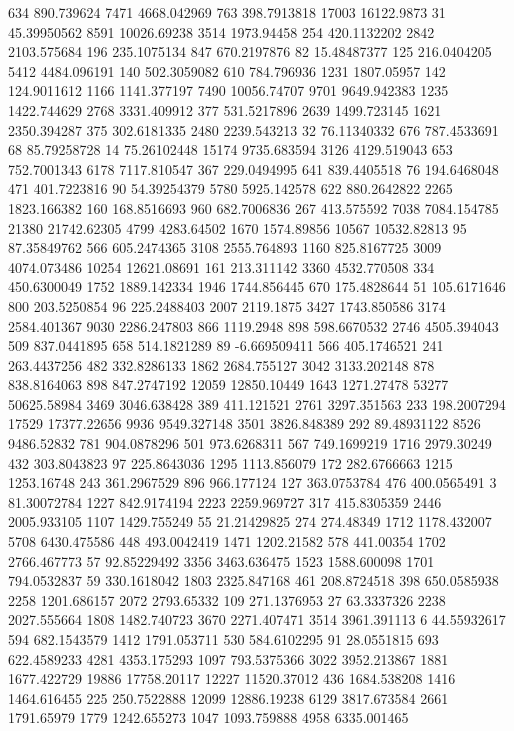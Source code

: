 634	890.739624
7471	4668.042969
763	398.7913818
17003	16122.9873
31	45.39950562
8591	10026.69238
3514	1973.94458
254	420.1132202
2842	2103.575684
196	235.1075134
847	670.2197876
82	15.48487377
125	216.0404205
5412	4484.096191
140	502.3059082
610	784.796936
1231	1807.05957
142	124.9011612
1166	1141.377197
7490	10056.74707
9701	9649.942383
1235	1422.744629
2768	3331.409912
377	531.5217896
2639	1499.723145
1621	2350.394287
375	302.6181335
2480	2239.543213
32	76.11340332
676	787.4533691
68	85.79258728
14	75.26102448
15174	9735.683594
3126	4129.519043
653	752.7001343
6178	7117.810547
367	229.0494995
641	839.4405518
76	194.6468048
471	401.7223816
90	54.39254379
5780	5925.142578
622	880.2642822
2265	1823.166382
160	168.8516693
960	682.7006836
267	413.575592
7038	7084.154785
21380	21742.62305
4799	4283.64502
1670	1574.89856
10567	10532.82813
95	87.35849762
566	605.2474365
3108	2555.764893
1160	825.8167725
3009	4074.073486
10254	12621.08691
161	213.311142
3360	4532.770508
334	450.6300049
1752	1889.142334
1946	1744.856445
670	175.4828644
51	105.6171646
800	203.5250854
96	225.2488403
2007	2119.1875
3427	1743.850586
3174	2584.401367
9030	2286.247803
866	1119.2948
898	598.6670532
2746	4505.394043
509	837.0441895
658	514.1821289
89	-6.669509411
566	405.1746521
241	263.4437256
482	332.8286133
1862	2684.755127
3042	3133.202148
878	838.8164063
898	847.2747192
12059	12850.10449
1643	1271.27478
53277	50625.58984
3469	3046.638428
389	411.121521
2761	3297.351563
233	198.2007294
17529	17377.22656
9936	9549.327148
3501	3826.848389
292	89.48931122
8526	9486.52832
781	904.0878296
501	973.6268311
567	749.1699219
1716	2979.30249
432	303.8043823
97	225.8643036
1295	1113.856079
172	282.6766663
1215	1253.16748
243	361.2967529
896	966.177124
127	363.0753784
476	400.0565491
3	81.30072784
1227	842.9174194
2223	2259.969727
317	415.8305359
2446	2005.933105
1107	1429.755249
55	21.21429825
274	274.48349
1712	1178.432007
5708	6430.475586
448	493.0042419
1471	1202.21582
578	441.00354
1702	2766.467773
57	92.85229492
3356	3463.636475
1523	1588.600098
1701	794.0532837
59	330.1618042
1803	2325.847168
461	208.8724518
398	650.0585938
2258	1201.686157
2072	2793.65332
109	271.1376953
27	63.3337326
2238	2027.555664
1808	1482.740723
3670	2271.407471
3514	3961.391113
6	44.55932617
594	682.1543579
1412	1791.053711
530	584.6102295
91	28.0551815
693	622.4589233
4281	4353.175293
1097	793.5375366
3022	3952.213867
1881	1677.422729
19886	17758.20117
12227	11520.37012
436	1684.538208
1416	1464.616455
225	250.7522888
12099	12886.19238
6129	3817.673584
2661	1791.65979
1779	1242.655273
1047	1093.759888
4958	6335.001465
